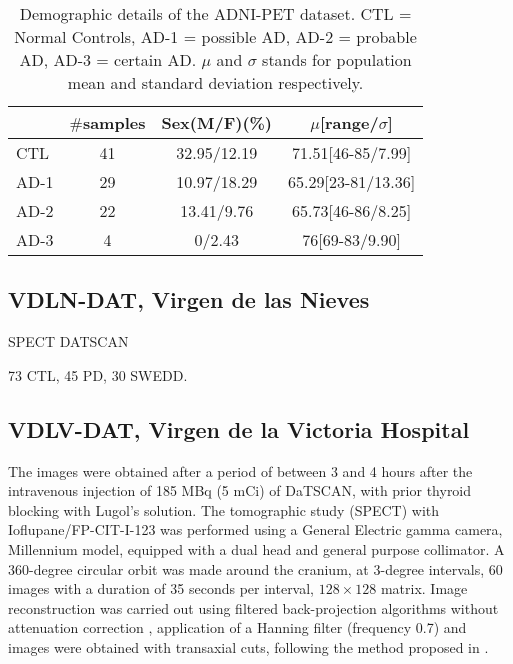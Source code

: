 \begin{table}
	\begin{center}
		\begin{tabular}{lccc}
			\toprule
			          & $\#$samples & Sex(M/F)(\%) & $\mu$[range/$\sigma$] \\ 
			          \midrule
			\ac{CTL}  &     41      & 32.95/12.19  &     71.51[46-85/7.99] \\
			\ac{AD}-1 &     29      & 10.97/18.29  &    65.29[23-81/13.36] \\
			\ac{AD}-2 &     22      &  13.41/9.76  &     65.73[46-86/8.25] \\
			\ac{AD}-3 &      4      &    0/2.43    &        76[69-83/9.90] \\ 
			\bottomrule
		\end{tabular}
		\caption[Demographic details of the ADNI-PET dataset.]{Demographic details of the ADNI-PET dataset. \ac{CTL} = Normal Controls, \ac{AD}-1 = possible \ac{AD}, \ac{AD}-2 = probable \ac{AD}, \ac{AD}-3 = certain \ac{AD}. $\mu$ and $\sigma$ stands for population mean and standard deviation respectively.}
		\label{tab:bd}
	\end{center}
\end{table}

\subsection{VDLN-DAT, Virgen de las Nieves}\label{sec:vdlndat}
\ac{SPECT} DATSCAN


73 \ac{CTL}, 45 \ac{PD}, 30 \ac{SWEDD}. 

\subsection{VDLV-DAT, Virgen de la Victoria Hospital}\label{sec:vdlvdat}
The images were obtained after a period of between 3 and 4 hours after the intravenous injection of 185 MBq (5 mCi) of DaTSCAN, with prior thyroid blocking with Lugol's solution. The tomographic study (\ac{SPECT}) with Ioflupane/FP-CIT-I-123 was performed using a General Electric gamma camera, Millennium model, equipped with a dual head and general purpose collimator. A 360-degree circular orbit was made around the cranium, at 3-degree intervals, 60 images with a duration of 35 seconds per interval, $128\times128$ matrix. Image reconstruction was carried out using filtered back-projection algorithms without attenuation correction \cite{Shepp82,Vardi1985}, application of a Hanning filter (frequency 0.7) and images were obtained with transaxial cuts, following the method proposed in \cite{Ramirez2009}. 

